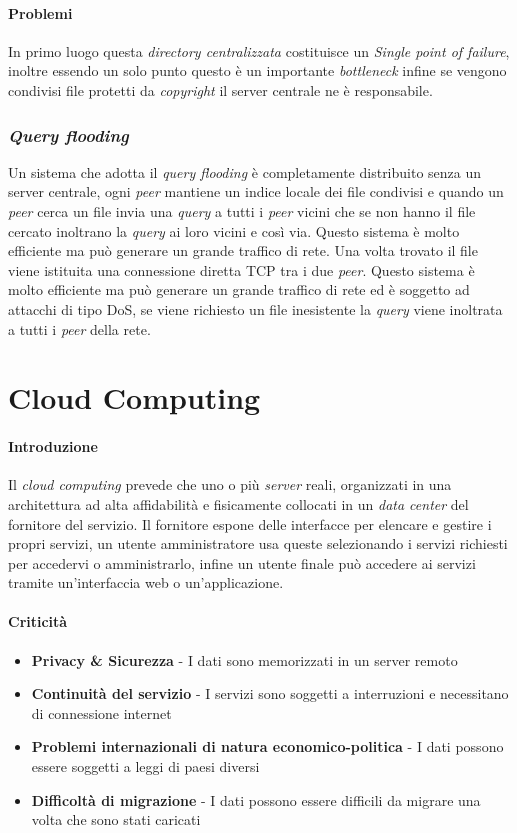                 \paragraph{Problemi} In primo luogo questa \textit{directory centralizzata} costituisce un \textit{Single point of failure}, inoltre essendo un solo punto questo è un importante \textit{bottleneck} infine se vengono condivisi file protetti da \textit{copyright} il server centrale ne è responsabile.
            \subsubsection{\textit{Query flooding}}
                Un sistema che adotta il \textit{query flooding} è completamente distribuito senza un server centrale, ogni \textit{peer} mantiene un indice locale dei file condivisi e quando un \textit{peer} cerca un file invia una \textit{query} a tutti i \textit{peer} vicini che se non hanno il file cercato inoltrano la \textit{query} ai loro vicini e così via. Questo sistema è molto efficiente ma può generare un grande traffico di rete. Una volta trovato il file viene istituita una connessione diretta \Acrshort*{TCP} tra i due \textit{peer}. Questo sistema è molto efficiente ma può generare un grande traffico di rete ed è soggetto ad attacchi di tipo \Acrshort*{DoS}, se viene richiesto un file inesistente la \textit{query} viene inoltrata a tutti i \textit{peer} della rete.
\section{Cloud Computing}
    \paragraph{Introduzione} Il \textit{cloud computing} prevede che uno o più \textit{server} reali, organizzati in una architettura ad alta affidabilità e fisicamente collocati in un \textit{data center} del fornitore del servizio. Il fornitore espone delle interfacce per elencare e gestire i propri servizi, un utente amministratore usa queste selezionando i servizi richiesti per accedervi o amministrarlo, infine un utente finale può accedere ai servizi tramite un'interfaccia web o un'applicazione.
    \paragraph{Criticità}
        \begin{itemize}
            \item \textbf{Privacy \& Sicurezza} - I dati sono memorizzati in un server remoto
            \item \textbf{Continuità del servizio} - I servizi sono soggetti a interruzioni e necessitano di connessione internet
            \item \textbf{Problemi internazionali di natura economico-politica} - I dati possono essere soggetti a leggi di paesi diversi
            \item \textbf{Difficoltà di migrazione} - I dati possono essere difficili da migrare una volta che sono stati caricati
        \end{itemize}
